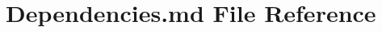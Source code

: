 \hypertarget{Dependencies_8md}{}\section{Dependencies.\+md File Reference}
\label{Dependencies_8md}
